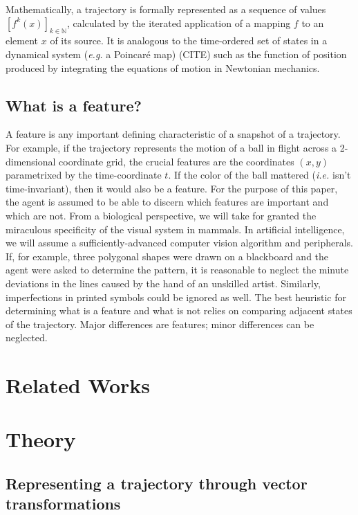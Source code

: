 \documentclass{article}
\begin{document}
Mathematically, a trajectory is formally represented as a sequence of values $\left[ f^k(x) \right]_{k \in \mathbb{N}}$,
calculated by the iterated application of a mapping $f$ to an element $x$ of its source.
It is analogous to the time-ordered set of states in a dynamical system (\textit{e.g.} a Poincar\'e map) (CITE)
such as the function of position produced by integrating the equations of motion in Newtonian mechanics.

\subsection{What is a feature?}

A feature is any important defining characteristic of a snapshot of a trajectory.
For example, if the trajectory represents the motion of a ball in flight across a 2-dimensional coordinate grid,
the crucial features are the coordinates $(x, y)$ parametrixed by the time-coordinate $t$.
If the color of the ball mattered (\textit{i.e.} isn't time-invariant), then it would also be a feature.
For the purpose of this paper, the agent is assumed to be able to discern which features are important and which are not.
From a biological perspective, we will take for granted the miraculous specificity of the visual system in mammals.
In artificial intelligence, we will assume a sufficiently-advanced computer vision algorithm and peripherals.
If, for example, three polygonal shapes were drawn on a blackboard and the agent were asked to determine the pattern,
it is reasonable to neglect the minute deviations in the lines caused by the hand of an unskilled artist.
Similarly, imperfections in printed symbols could be ignored as well.
The best heuristic for determining what is a feature and what is not relies on comparing adjacent states of the trajectory.
Major differences are features; minor differences can be neglected.

\section{Related Works}

\section{Theory}

\subsection{Representing a trajectory through vector transformations}
\label{sec:vectorrepresentation}
\end{document}
